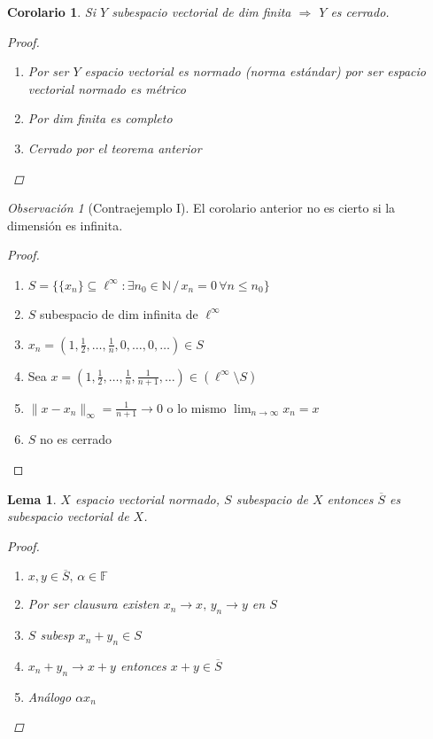 \documentclass[12pt,a4paper]{article}
\newtheorem{lemma}[theorem]{Lema}
\newtheorem{corollary}[theorem]{Corolario}
\theoremstyle{definition}
\theoremstyle{remark}
\newtheorem{remark}[theorem]{Observación}
\begin{document}
\begin{corollary}
Si $Y$ subespacio vectorial de dim finita $\Rightarrow$ $Y$ es cerrado.
\begin{proof}
\begin{enumerate}
    \item Por ser $Y$ espacio vectorial es normado (norma estándar) por ser espacio vectorial normado es métrico
    \item Por dim finita es completo
    \item Cerrado por el teorema anterior
\end{enumerate}
\end{proof}
\end{corollary}

\begin{remark}[Contraejemplo I]
El corolario anterior no es cierto si la dimensión es infinita.
\begin{proof}
\begin{enumerate}
    \item $S=\bigg\{\{x_n\} \subseteq\ell^{\infty}:\exists n_0\in \mathbb{N} \,/\, x_n=0 \,\forall n\leq n_0\bigg\}$
    \item $S$ subespacio de dim infinita de $\ell^{\infty}$
    \item $x_n = (1, \frac{1}{2},\dots, \frac{1}{n},0,\dots,0,\ldots) \in S$
    \item Sea $x=\left(1, \frac{1}{2},\dots, \frac{1}{n}, \frac{1}{n+1},\dots\right)\in (\ell^{\infty}\setminus S)$
    \item $\|x-x_n\|_{\infty} = \frac{1}{n+1}\rightarrow 0$ o lo mismo $\lim_{n \to \infty}x_n=x$
    \item $S$ no es cerrado
\end{enumerate}
\end{proof}
\end{remark}

\begin{lemma}
$X$ espacio vectorial normado, $S$ subespacio de $X$ entonces $\overline{S}$ es subespacio vectorial de $X$.
\begin{proof}
\begin{enumerate}
    \item $x,y\in \overline{S},\, \alpha \in \mathbb{F}$
    \item Por ser clausura existen $x_n\rightarrow x,\, y_n\rightarrow y$ en $S$
    \item $S$ subesp $x_n+y_n\in S$
    \item $x_n+y_n\rightarrow x+y$ entonces $x+y\in\overline{S}$
    \item Análogo $\alpha x_n$
\end{enumerate}
\end{proof}
\end{lemma}
\end{document}

